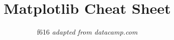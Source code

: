 \documentclass[10pt,a4paper]{article}
\title{{\color{alert} Matplotlib }\textbf {\color{black} Cheat Sheet}}
\author{f616 \emph{adapted from datacamp.com}}
\date{}
\begin{document}
\small
\begin{multicols}{2}

\maketitle
\thispagestyle{empty}
\scriptsize






\end{multicols}
\end{document}
